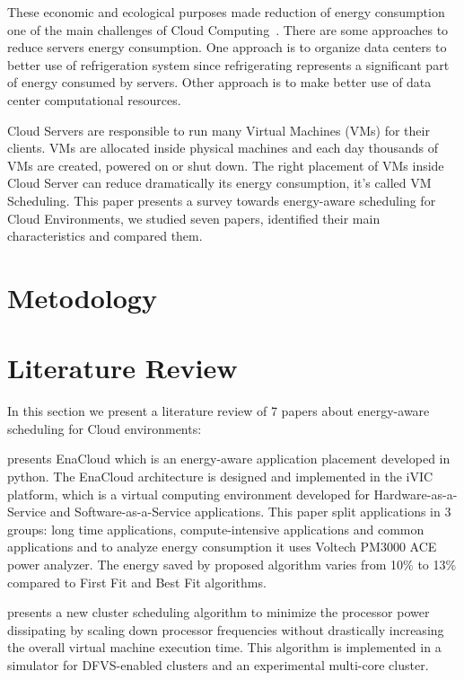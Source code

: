 \documentclass{article}
\begin{document}
These economic and ecological purposes made reduction of energy consumption one of the main challenges of Cloud Computing~\cite{Baliga}. There are some approaches to reduce servers energy consumption. One approach is to organize data centers to better use of refrigeration system since refrigerating represents a significant part of energy consumed by servers. Other approach is to make better use of data center computational resources.

Cloud Servers are responsible to run many Virtual Machines (VMs) for their clients. VMs are allocated inside physical machines and each day thousands of VMs are created, powered on or shut down. The right placement of VMs inside Cloud Server can reduce dramatically its energy consumption, it's called VM Scheduling. This paper presents a survey towards energy-aware scheduling for Cloud Environments, we studied seven papers, identified their main characteristics and compared them.  

\section{Metodology}

\section{Literature Review}

In this section we present a literature review of 7 papers about energy-aware scheduling for Cloud environments:

\cite{bli:2009} presents EnaCloud which is an energy-aware application placement developed in python. The EnaCloud architecture is designed and implemented in the iVIC platform, which is a virtual computing environment developed for Hardware-as-a-Service and Software-as-a-Service applications. This paper split applications in 3 groups: long time applications, compute-intensive applications and common applications and to analyze energy consumption it uses Voltech PM3000 ACE power analyzer. The energy saved by proposed algorithm varies from 10\% to 13\% compared to First Fit and Best Fit algorithms.

\cite{Gregor} presents a new cluster scheduling algorithm to minimize the processor power dissipating by scaling down processor frequencies without drastically increasing the overall virtual machine execution time. This algorithm is implemented in a simulator for DFVS-enabled clusters and an experimental
multi-core cluster. 
\end{document}
